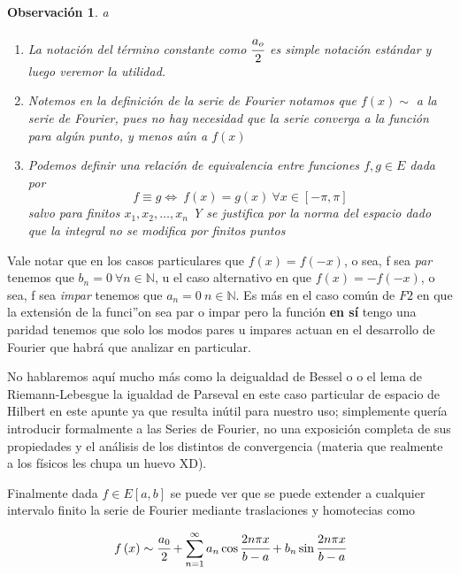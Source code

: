 \documentclass[a4paper,spanish]{article}
\def\N {\mathbb{N}}
\newtheorem{obs}[prop]{Observaci\'on}
\numberwithin{equation}{section}
\begin{document}
\begin{obs} a\\

\begin{enumerate}

\item La notaci\'on del t\'ermino constante como $\cfrac{a_o}{2}$ es simple notaci\'on est\'andar y luego veremor la utilidad.
\item Notemos en la definici\'on de la serie de Fourier notamos que $f(x) \sim$ a la serie de Fourier, pues no hay necesidad que la serie converga a la funci\'on para alg\'un punto, y menos a\'un a $f(x)$
\item Podemos definir una relaci\'on de equivalencia entre funciones $f,g \in E$ dada por 
\[ f \equiv g \Longleftrightarrow \ f\left({x}\right)=g\left({x}\right) \ \forall x \in [-\pi,\pi] \] salvo para finitos $x_1,x_2,\dots,x_n$
 Y se justifica por la norma del espacio dado que la integral no se modifica por finitos puntos 
\end{enumerate}
\end{obs}

Vale notar que en los casos particulares que $f(x)=f(-x)$, o sea, f sea \textit{par} tenemos que $b_n=0 \ \forall n\in \N$, u el caso alternativo en que $f(x)=-f(-x)$, o sea, f sea \textit{impar} tenemos que $a_n=0 \ n\in\N$. Es m\'as en el caso com\'un de $F2$ en que la extensi\'on de la funci''on sea par o impar pero la funci\'on \textbf{en s\'i} tengo una paridad tenemos que solo los modos pares u impares actuan en el desarrollo de Fourier que habr\'a que analizar en particular. 

\smallskip

No hablaremos aqu\'i mucho m\'as como la deigualdad de Bessel o o el lema de Riemann-Lebesgue la igualdad de Parseval en este caso particular de espacio de Hilbert en este apunte ya que resulta in\'util para nuestro uso; simplemente quer\'ia introducir formalmente a las Series de Fourier, no una exposici\'on completa de sus propiedades y el an\'alisis de los distintos de convergencia (materia que realmente a los f\'isicos les chupa un huevo XD).

\smallskip

Finalmente dada $f \in E[a,b]$ se puede ver que se puede extender a cualquier intervalo finito la serie de Fourier mediante traslaciones y homotecias como

\begin{equation}
f \left({x}\right) \sim \cfrac{a_0}{2} + \sum \limits_{n=1}^{\infty} {a_n \cos{ \cfrac{2n \pi x}{b-a}} + b_n \sin{ \cfrac{2n \pi x}{b-a}}} 
\end{equation}
\end{document}

